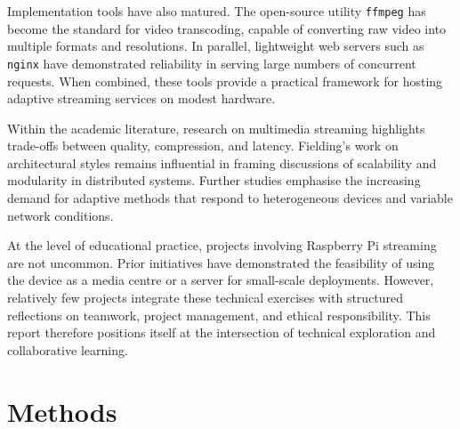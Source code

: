 \documentclass[11pt]{article}
\begin{document}
Implementation tools have also matured. The open-source utility \texttt{ffmpeg} has become the standard for video transcoding, capable of converting raw video into multiple formats and resolutions. In parallel, lightweight web servers such as \texttt{nginx} have demonstrated reliability in serving large numbers of concurrent requests. When combined, these tools provide a practical framework for hosting adaptive streaming services on modest hardware.

Within the academic literature, research on multimedia streaming highlights trade-offs between quality, compression, and latency. Fielding’s \cite{fielding2000} work on architectural styles remains influential in framing discussions of scalability and modularity in distributed systems. Further studies emphasise the increasing demand for adaptive methods that respond to heterogeneous devices and variable network conditions.

At the level of educational practice, projects involving Raspberry Pi streaming are not uncommon. Prior initiatives have demonstrated the feasibility of using the device as a media centre or a server for small-scale deployments. However, relatively few projects integrate these technical exercises with structured reflections on teamwork, project management, and ethical responsibility. This report therefore positions itself at the intersection of technical exploration and collaborative learning.

\section{Methods}
\end{document}
